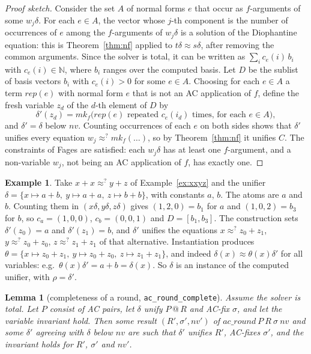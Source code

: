 \documentclass[11pt,a4paper]{article}
\newtheorem{lemma}[theorem]{Lemma}
\theoremstyle{definition}
\newtheorem{example}[theorem]{Example}
\theoremstyle{remark}
\newcommand{\isa}[1]{\mbox{\small\texttt{#1}}}
\newcommand{\eqAC}{\approx}
\newcommand{\mkac}{\mathit{mk}}
\newcommand{\N}{\mathbb{N}}
\begin{document}
\begin{proof}[Proof sketch]
  Consider the set $A$ of normal forms $e$ that occur as $f$-arguments of some $w_j\delta$. For
  each $e \in A$, the vector whose $j$-th component is the number of occurrences of $e$ among the
  $f$-arguments of $w_j\delta$ is a solution of the Diophantine equation: this is
  Theorem~\ref{thm:nf} applied to $t\delta \eqAC s\delta$, after removing the common arguments.
  Since the solver is total, it can be written as $\sum_i c_e(i)\, b_i$ with $c_e(i)\in\N$, where
  $b_i$ ranges over the computed basis. Let $D$ be the sublist of basis vectors $b_i$ with
  $c_e(i) > 0$ for some $e\in A$. Choosing for each $e \in A$ a term $\mathit{rep}(e)$ with normal
  form $e$ that is not an AC application of $f$, define the fresh variable $z_d$ of the $d$-th
  element of $D$ by
  \[
    \delta'(z_d) = \mkac_f\bigl(\text{$\mathit{rep}(e)$ repeated $c_e(i_d)$ times, for each } e \in A\bigr),
  \]
  and $\delta' = \delta$ below $\mathit{nv}$. Counting occurrences of each $e$ on both sides shows
  that $\delta'$ unifies every equation $w_j \approx^? \mkac_f(\dots)$, so by
  Theorem~\ref{thm:nf} it unifies $C$. The constraints of Fages are satisfied: each $w_j\delta$ has
  at least one $f$-argument, and a non-variable $w_j$, not being an AC application of $f$, has
  exactly one.
\end{proof}

\begin{example}\label{ex:complete}
  Take $x + x \approx^? y + z$ of Example~\ref{ex:xxyz} and the unifier
  $\delta = \{x \mapsto a + b,\ y \mapsto a + a,\ z \mapsto b + b\}$, with constants $a$, $b$.
  The atoms are $a$ and $b$. Counting them in $(x\delta, y\delta, z\delta)$ gives $(1,2,0) = b_1$
  for $a$ and $(1,0,2) = b_3$ for $b$, so $c_a = (1,0,0)$, $c_b = (0,0,1)$ and $D = [b_1, b_3]$.
  The construction sets $\delta'(z_0) = a$ and $\delta'(z_1) = b$, and $\delta'$ unifies the
  equations $x \approx^? z_0 + z_1$, $y \approx^? z_0 + z_0$, $z \approx^? z_1 + z_1$ of that
  alternative. Instantiation produces $\theta = \{x \mapsto z_0 + z_1,\ y \mapsto z_0 + z_0,\
  z \mapsto z_1 + z_1\}$, and indeed $\delta(x) \eqAC \theta(x)\delta'$ for all variables: e.g.\
  $\theta(x)\delta' = a + b = \delta(x)$. So $\delta$ is an instance of the computed unifier, with
  $\rho = \delta'$.
\end{example}

\begin{lemma}[completeness of a round, \isa{ac\_round\_complete}]
  Assume the solver is total. Let $P$ consist of AC pairs, let $\delta$ unify $P \mathbin{@} R$
  and AC-fix $\sigma$, and let the variable invariant hold. Then some result
  $(R', \sigma', \mathit{nv}')$ of $\mathit{ac\_round}\ P\ R\ \sigma\ \mathit{nv}$ and some
  $\delta'$ agreeing with $\delta$ below $\mathit{nv}$ are such that $\delta'$ unifies $R'$,
  AC-fixes $\sigma'$, and the invariant holds for $R'$, $\sigma'$ and $\mathit{nv}'$.
\end{lemma}
\end{document}
